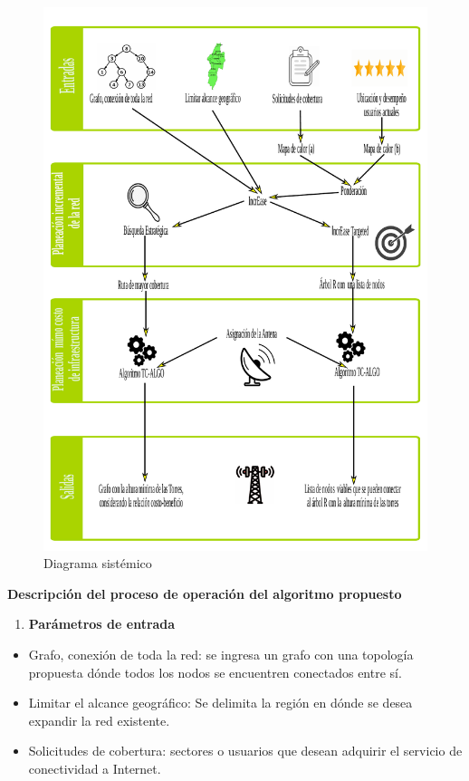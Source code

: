 \documentclass[]{article}
\providecommand{\tightlist}{%
  \setlength{\itemsep}{0pt}\setlength{\parskip}{0pt}}
\begin{document}
\begin{figure}
\centering
\includegraphics{Diagrama_sistemico.pdf}
\caption{Diagrama sistémico}
\end{figure}

\textbf{Descripción del proceso de operación del algoritmo propuesto}

\begin{enumerate}
\def\labelenumi{\arabic{enumi}.}
\tightlist
\item
  \textbf{Parámetros de entrada}
\end{enumerate}

\begin{itemize}
\item
  Grafo, conexión de toda la red: se ingresa un grafo con una topología
  propuesta dónde todos los nodos se encuentren conectados entre sí.
\item
  Limitar el alcance geográfico: Se delimita la región en dónde se desea
  expandir la red existente.
\item
  Solicitudes de cobertura: sectores o usuarios que desean adquirir el
  servicio de conectividad a Internet.
\end{itemize}
\end{document}
